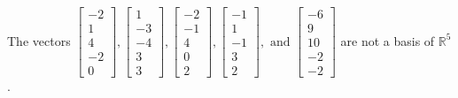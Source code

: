 \begin{exercise}
\begin{exerciseStatement}
  \end{exerciseStatement}
  \begin{exerciseAnswer}
   The vectors \(\left[\begin{array}{r}
-2 \\
1 \\
4 \\
-2 \\
0
\end{array}\right] , \left[\begin{array}{r}
1 \\
-3 \\
-4 \\
3 \\
3
\end{array}\right] , \left[\begin{array}{r}
-2 \\
-1 \\
4 \\
0 \\
2
\end{array}\right] , \left[\begin{array}{r}
-1 \\
1 \\
-1 \\
3 \\
2
\end{array}\right] , \text{ and } \left[\begin{array}{r}
-6 \\
9 \\
10 \\
-2 \\
-2
\end{array}\right]\) 
  	 are not  a basis of \(\mathbb{R}^5\).
  


  \end{exerciseAnswer}
\end{exercise}